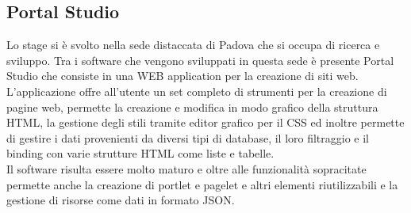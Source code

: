 \subsection{Portal Studio}
Lo stage si è svolto nella sede distaccata di Padova che si occupa di ricerca e sviluppo.
Tra i software che vengono sviluppati in questa sede è presente Portal Studio che consiste in una WEB application per la creazione di siti web.\\
L'applicazione offre all'utente un set completo di strumenti per la creazione di pagine web, permette la creazione e modifica in modo grafico della struttura HTML, la gestione degli stili tramite editor grafico per il CSS ed inoltre permette di gestire i dati provenienti da diversi tipi di database, il loro filtraggio e il binding con varie strutture HTML come liste e tabelle.\\
Il software risulta essere molto maturo e oltre alle funzionalità sopracitate permette anche la creazione di portlet e pagelet e altri elementi riutilizzabili e la gestione di risorse come dati in formato JSON.


